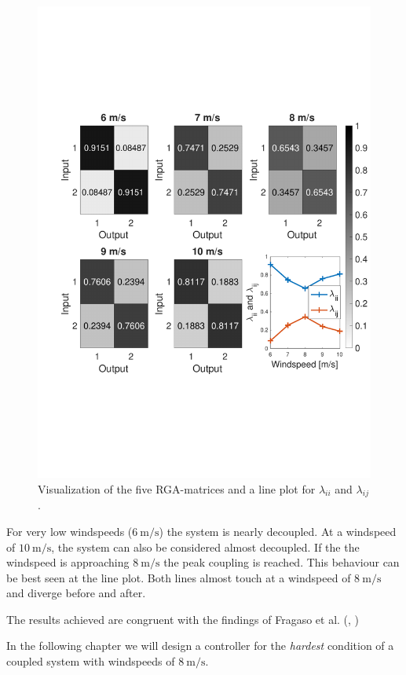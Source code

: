 \begin{figure}[H]
    \center
    \includegraphics[scale=0.7,trim=40 180 0 120,clip]{fig/RGA_results.pdf}
    \caption{Visualization of the five RGA-matrices and a line plot for $\lambda_{ii}$ and $\lambda_{ij}$.}
    \label{fig:analysis:RGA_results}
\end{figure}

For very low windspeeds ($\SI{6}{\metre\per\second}$) the system is nearly decoupled.
At a windspeed of $\SI{10}{\metre\per\second}$, the system can also be considered almost decoupled.
If the the windspeed is approaching $\SI{8}{\metre\per\second}$ the peak coupling is reached.
This behaviour can be best seen at the line plot.
Both lines almost touch at a windspeed of $\SI{8}{\metre\per\second}$ and diverge before and after.

The results achieved are congruent with the findings of Fragaso et al. (\cite[p. 7]{Fragoso_et_al_2017}, \cite[p. 123]{Fragoso_PhD_2016})

In the following chapter we will design a controller for the \textit{hardest} condition of a coupled system with windspeeds of $\SI{8}{\metre\per\second}$.
